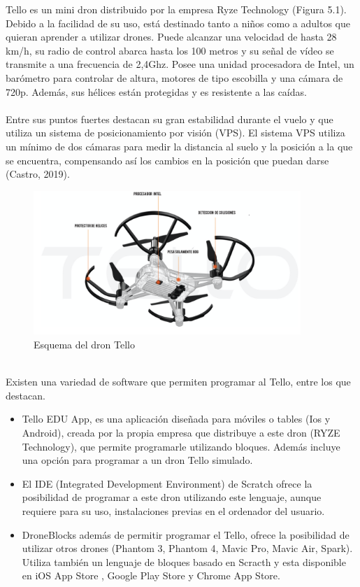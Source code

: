 \documentclass{report}
\begin{document}
Tello es un mini dron distribuido por la empresa Ryze Technology (Figura 5.1). Debido a la facilidad de su uso, está destinado tanto a niños como a adultos que quieran aprender a utilizar drones. Puede alcanzar una velocidad de hasta 28 km/h, su radio de control abarca hasta los 100 metros y su señal de vídeo se transmite a una frecuencia de 2,4Ghz. Posee una unidad procesadora de Intel, un barómetro para controlar de altura, motores de tipo escobilla y una cámara de 720p. Además, sus hélices están protegidas y es resistente a las caídas.
\\
\\
Entre sus puntos fuertes destacan su gran estabilidad durante el vuelo y que utiliza un sistema de posicionamiento por visión (VPS). El sistema VPS utiliza un mínimo de dos cámaras para medir la distancia al suelo y la posición a la que se encuentra, compensando así los cambios en la posición que puedan darse (Castro, 2019).
\\
\begin{figure}[h!]
  \centering
    \includegraphics[width=0.9\textwidth]{images/partes_dron_tello.png}
  \caption{Esquema del dron Tello}
  \label{Esquema del dron Tello}
\end{figure}
\\
Existen una variedad de software que permiten programar al Tello, entre los que destacan.
\begin{itemize}
	\item Tello EDU App, es una aplicación diseñada para móviles o tables (Ios y Android), creada por la propia empresa que distribuye a este dron (RYZE Technology), que permite programarle utilizando bloques. Además incluye una opción para programar a un dron Tello simulado.
	\item El IDE (Integrated Development Environment) de Scratch ofrece la posibilidad de programar a este dron utilizando este lenguaje, aunque requiere para su uso, instalaciones previas en el ordenador del usuario.
	\item DroneBlocks además de permitir programar el Tello, ofrece la posibilidad de utilizar otros drones (Phantom 3, Phantom 4, Mavic Pro, Mavic Air, Spark). Utiliza también un lenguaje de bloques basado en Scracth y esta disponible en iOS App Store ,  Google Play Store y Chrome App Store.
\end{itemize}
\end{document}

